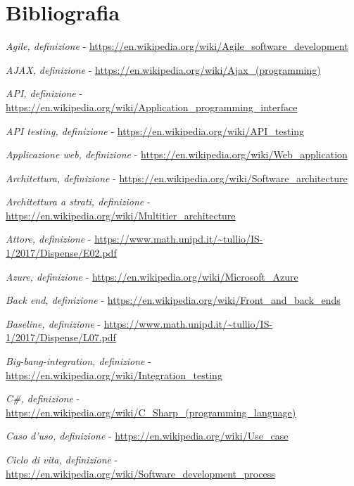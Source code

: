 

\cleardoublepage
\chapter{Bibliografia}

\begin{enumerate}[label={[\arabic*]}]
	\item \textit{Agile, definizione} - \url{https://en.wikipedia.org/wiki/Agile_software_development}
	\item \textit{AJAX, definizione} - \url{https://en.wikipedia.org/wiki/Ajax_(programming)}
	\item \textit{API, definizione} - \url{https://en.wikipedia.org/wiki/Application_programming_interface}
	\item \textit{API testing, definizione} - \url{https://en.wikipedia.org/wiki/API_testing}
	\item \textit{Applicazione web, definizione} - \url{https://en.wikipedia.org/wiki/Web_application}
	\item \textit{Architettura, definizione} - \url{https://en.wikipedia.org/wiki/Software_architecture}
	\item \textit{Architettura a strati, definizione} - \url{https://en.wikipedia.org/wiki/Multitier_architecture}
	\item \textit{Attore, definizione} - \url{https://www.math.unipd.it/~tullio/IS-1/2017/Dispense/E02.pdf}
	\item \textit{Azure, definizione} - \url{https://en.wikipedia.org/wiki/Microsoft_Azure}
	\item \textit{Back end, definizione} - \url{https://en.wikipedia.org/wiki/Front_and_back_ends}
	\item \textit{Baseline, definizione} - \url{https://www.math.unipd.it/~tullio/IS-1/2017/Dispense/L07.pdf}
	\item \textit{Big-bang-integration, definizione} - \url{https://en.wikipedia.org/wiki/Integration_testing} 
	\item \textit{C\#, definizione} - \url{https://en.wikipedia.org/wiki/C_Sharp_(programming_language)}
	\item \textit{Caso d’uso, definizione} - \url{https://en.wikipedia.org/wiki/Use_case}
	\item \textit{Ciclo di vita, definizione} - \url{https://en.wikipedia.org/wiki/Software_development_process}

\end{enumerate}

